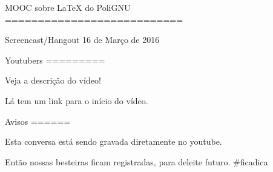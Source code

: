 MOOC sobre LaTeX do PoliGNU
===========================

Screencast/Hangout  16 de Março de 2016


Youtubers
=========

Veja a descrição do vídeo!

Lá tem um link para o início do vídeo.


Avisos
======

Esta conversa está sendo gravada
diretamente no youtube.

Então nossas besteiras ficam registradas,
para deleite futuro. #ficadica

